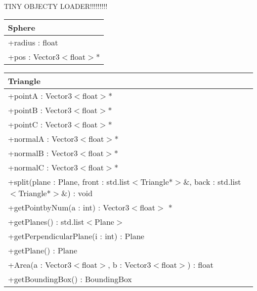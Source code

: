 TINY OBJECTY LOADER!!!!!!!!!

\begin{center}
    \begin{tabular}{|l|}
    \hline
    Sphere \\ \hline
    +radius : float \\
    +pos : Vector3$<$float$>$* \\
    \hline
    \end{tabular}
\end{center}

\begin{center}
    \begin{tabular}{|l|}
    \hline
    Triangle \\ \hline
    +pointA : Vector3$<$float$>$* \\
    +pointB : Vector3$<$float$>$* \\
    +pointC : Vector3$<$float$>$* \\
    +normalA : Vector3$<$float$>$* \\
    +normalB : Vector3$<$float$>$* \\
    +normalC : Vector3$<$float$>$* \\
    \hline
	+split(plane : Plane, front : std.list$<$Triangle*$>$\&, back : std.list$<$Triangle*$>$\&) : void \\ 
	+getPointbyNum(a : int) : Vector3$<$float$>$ * \\
	+getPlanes() : std.list$<$Plane$>$ \\
	+getPerpendicularPlane(i : int) : Plane \\
	+getPlane() : Plane \\
	+Area(a : Vector3$<$float$>$, b : Vector3$<$float$>$) : float \\
	+getBoundingBox() : BoundingBox \\
	\hline
    \end{tabular}
\end{center}


